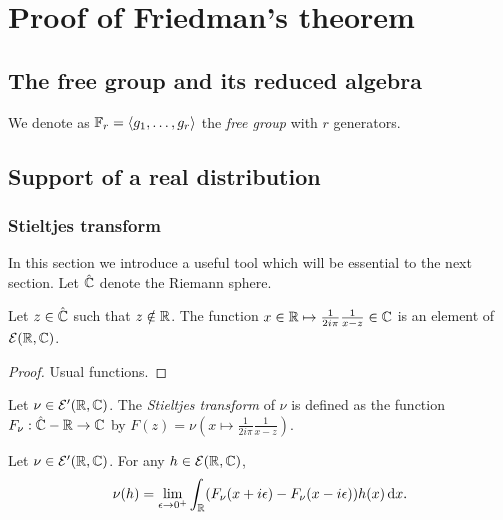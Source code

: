 \chapter{Proof of Friedman's theorem}

\section{The free group and its reduced algebra}

\begin{definition}
  \label{def:free_group}
  We denote as $\mathbb{F}_r = \langle g_1, \ldots, g_r \rangle$ the \emph{free group} with $r$ generators.
\end{definition}

\section{Support of a real distribution}

\subsection{Stieltjes transform}

In this section we introduce a useful tool which will be essential to the next section.
Let $\hat{\mathbb{C}}$ denote the Riemann sphere.

\begin{lemma}
  \label{lem:Stieltjes_function}
  Let $z \in \hat{\mathbb{C}}$ such that $z \notin \mathbb{R}$.
  The function $x \in \mathbb{R} \mapsto \frac{1}{2i\pi} \frac{1}{x-z} \in \mathbb{C}$ is
  an element of $\mathcal{E}(\mathbb{R}, \mathbb{C})$.
\end{lemma}

\begin{proof}
  Usual functions.
\end{proof}

\begin{definition}
  \label{def:Stieltjes}
  Let $\nu \in \mathcal{E}'(\mathbb{R}, \mathbb{C})$.
  The \emph{Stieltjes transform} of $\nu$ is defined as the function
  $F_\nu : \hat{\mathbb{C}} - \mathbb{R} \rightarrow \mathbb{C}$ by $F(z) = \nu(x \mapsto \frac{1}{2 i \pi}\frac{1}{x-z})$.
\end{definition}

\begin{theorem}
  \label{thm:Stieltjes_boundary_values}
  \notready
  Let $\nu \in \mathcal{E}'(\mathbb{R}, \mathbb{C})$.
  For any $h \in \mathcal{E}(\mathbb{R}, \mathbb{C})$,
  \begin{equation*}
    \nu(h)
    =
    \lim_{\epsilon \rightarrow 0^+}
    \int_{\mathbb{R}} (F_\nu(x+i \epsilon) - F_\nu(x - i \epsilon)) h(x) \, \mathrm{d} x.
  \end{equation*}
\end{theorem}

